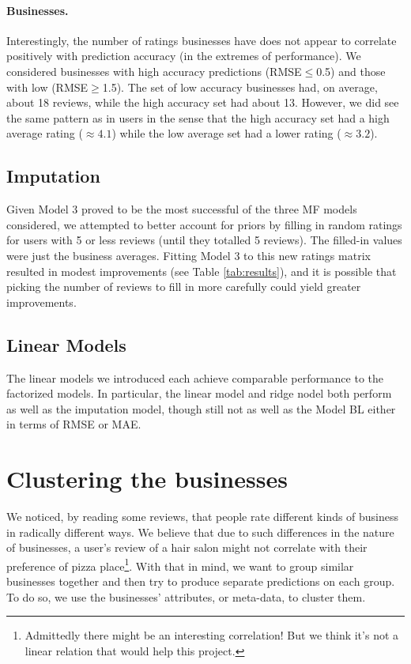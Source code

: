 \documentclass[12pt]{article}
\begin{document}
\paragraph{Businesses.} Interestingly, the number of ratings businesses have does not appear to correlate positively with prediction accuracy (in the extremes of performance). We considered businesses with high accuracy predictions (RMSE$\leq$0.5) and those with low (RMSE$\geq$1.5). The set of low accuracy businesses had, on average, about 18 reviews, while the high accuracy set had about 13. However, we did see the same pattern as in users in the sense that the high accuracy set had a high average rating ($\approx4.1$) while the low average set had a lower rating ($\approx3.2$).

\subsection{Imputation}  
Given Model 3 proved to be the most successful of the three MF models considered, we attempted to better account for priors by filling in random ratings for users with 5 or less reviews (until they totalled 5 reviews). The filled-in values were just the business averages. Fitting Model 3 to this new ratings matrix resulted in modest improvements (see Table \ref{tab:results}), and it is possible that picking the number of reviews to fill in more carefully could yield greater improvements. 

\subsection{Linear Models}
The linear models we introduced each achieve comparable performance to the factorized models. In particular, the linear model and ridge nodel both perform as well as the imputation model, though still not as well as the Model BL either in terms of RMSE or MAE.

\section{Clustering the businesses}\label{clust}
We noticed, by reading some reviews, that people rate different kinds of business in radically different ways. %
We believe that due to such differences in the nature of businesses, a user's review of a hair salon might not correlate with their preference of pizza place\footnote{Admittedly there might be an interesting correlation! But we think it's not a linear relation that would help this project.}.
With that in mind, we want to group similar businesses together and then try to produce separate predictions on each group. To do so, we use the businesses' attributes, or meta-data, to cluster them.
\end{document}
